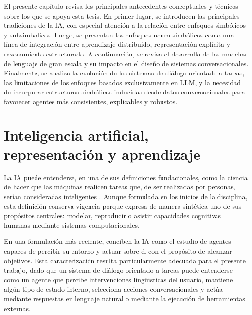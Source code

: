 %
%

El presente capítulo revisa los principales antecedentes conceptuales y técnicos sobre
los que se apoya esta tesis. En primer lugar, se introducen las principales tradiciones
de la \ac{IA}, con especial atención a la relación entre enfoques simbólicos y
subsimbólicos. Luego, se presentan los enfoques neuro-simbólicos como una línea de
integración entre aprendizaje distribuido, representación explícita y razonamiento
estructurado. A continuación, se revisa el desarrollo de los modelos de lenguaje de
gran escala y su impacto en el diseño de sistemas conversacionales. Finalmente, se
analiza la evolución de los sistemas de diálogo orientado a tareas, las limitaciones de
los enfoques basados exclusivamente en \ac{LLM}, y la necesidad de incorporar
estructuras simbólicas inducidas desde datos conversacionales para favorecer agentes
más consistentes, explicables y robustos.

\section{Inteligencia artificial, representación y aprendizaje}

La \ac{IA} puede entenderse, en una de sus definiciones fundacionales, como la ciencia
de hacer que las máquinas realicen tareas que, de ser realizadas por personas, serían
consideradas inteligentes \citep{minsky1961steps}. Aunque formulada en los inicios
de la disciplina, esta definición conserva vigencia porque expresa de manera sintética
uno de sus propósitos centrales: modelar, reproducir o asistir capacidades cognitivas
humanas mediante sistemas computacionales.

En una formulación más reciente, \citet{russell2020artificial} conciben la \ac{IA}
como el estudio de agentes capaces de percibir su entorno y actuar sobre él con el
propósito de alcanzar objetivos. Esta caracterización resulta particularmente adecuada
para el presente trabajo, dado que un sistema de diálogo orientado a tareas puede
entenderse como un agente que percibe intervenciones lingüísticas del usuario,
mantiene algún tipo de estado interno, selecciona acciones conversacionales y actúa
mediante respuestas en lenguaje natural o mediante la ejecución de herramientas
externas.

